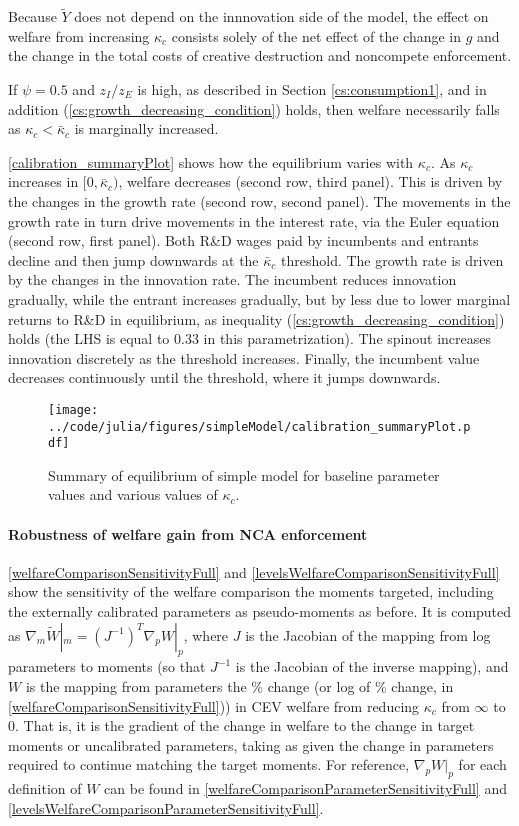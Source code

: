 \documentclass[11pt,english]{article}
\theoremstyle{remark}
\begin{document}
Because $\tilde{Y}$ does not depend on the innnovation side of the model, the effect on welfare from increasing $\kappa_c$ consists solely of the net effect of the change in $g$ and the change in the total costs of creative destruction and noncompete enforcement.

If $\psi = 0.5$ and $z_I / z_E$ is high, as described in Section \ref{cs:consumption1}, and in addition (\ref{cs:growth_decreasing_condition}) holds, then welfare necessarily falls as $\kappa_c < \bar{\kappa}_c$ is marginally increased. 

\autoref{calibration_summaryPlot} shows how the equilibrium varies with $\kappa_c$. As $\kappa_c$ increases in $[0,\bar{\kappa}_c)$, welfare decreases (second row, third panel). This is driven by the changes in the growth rate (second row, second panel). The movements in the growth rate in turn drive movements in the interest rate, via the Euler equation (second row, first panel). Both R\&D wages paid by incumbents and entrants decline and then jump downwards at the $\bar{\kappa}_c$ threshold. The growth rate is driven by the changes in the innovation rate. The incumbent reduces innovation gradually, while the entrant increases gradually, but by less due to lower marginal returns to R\&D in equilibrium, as inequality (\ref{cs:growth_decreasing_condition}) holds (the LHS is equal to 0.33 in this parametrization). The spinout increases innovation discretely as the threshold increases. Finally, the incumbent value decreases continuously until the threshold, where it jumps downwards.

\begin{figure}[]
	\texttt{[image: ../code/julia/figures/simpleModel/calibration\_summaryPlot.pdf]}
	\caption{Summary of equilibrium of simple model for baseline parameter values and various values of $\kappa_c$.}
	\label{calibration_summaryPlot}
\end{figure}



\paragraph{Robustness of welfare gain from NCA enforcement}

\autoref{welfareComparisonSensitivityFull} and \autoref{levelsWelfareComparisonSensitivityFull} show the sensitivity of the welfare comparison the moments targeted, including the externally calibrated parameters as pseudo-moments as before. It is computed as $\nabla_m \tilde{W}|_m = (J^{-1})^T \nabla_p W|_p$, where $J$ is the Jacobian of the mapping from log parameters to moments (so that $J^{-1}$ is the Jacobian of the inverse mapping), and $W$ is the mapping from parameters the \% change (or log of \% change, in \autoref{welfareComparisonSensitivityFull})) in CEV welfare from reducing $\kappa_c$ from $\infty$ to $0$. That is, it is the gradient of the change in welfare to the change in target moments or uncalibrated parameters, taking as given the change in parameters required to continue matching the target moments. For reference, $\nabla_p W|_p$  for each definition of $W$ can be found in \autoref{welfareComparisonParameterSensitivityFull} and \autoref{levelsWelfareComparisonParameterSensitivityFull}.
\end{document}
